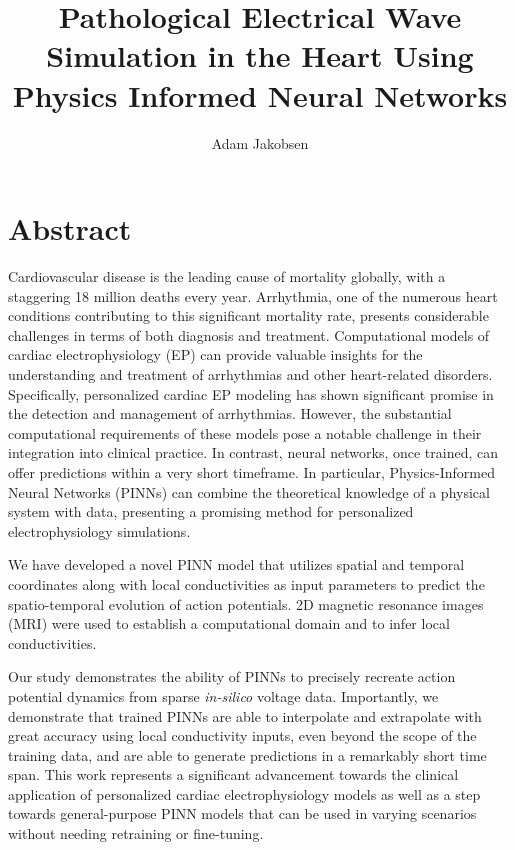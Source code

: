 \documentclass[USenglish]{uiomasterthesis}  %
\begin{document}
\title{Pathological Electrical Wave Simulation in the Heart Using Physics Informed Neural Networks}

\author{Adam Jakobsen }

\uiomasterfp[dept={Department of Physics},  %
  program={Computational Science: Physics},                        %
  supervisors={Gabriel Balaban, Molly Maleckar, Vajira Tambawita, Thus Nguyen and Morten Hjorth-Jensen},                    %
  long]  

\newpage

\section*{Abstract}
Cardiovascular disease is the leading cause of mortality globally, with a staggering 18 million deaths every year.
Arrhythmia, one of the numerous heart conditions contributing to this significant mortality rate, presents considerable challenges in terms of both diagnosis and treatment. 
Computational models of cardiac electrophysiology (EP) can provide valuable insights for the understanding and treatment of arrhythmias and other heart-related disorders. Specifically, personalized cardiac EP modeling has shown significant promise in the detection and management of arrhythmias. However, the substantial computational requirements of these models pose a notable challenge in their integration into clinical practice. In contrast, neural networks, once trained, can offer predictions within a very short timeframe.  In particular, Physics-Informed Neural Networks (PINNs) can combine the theoretical knowledge of a physical system with data, presenting a promising method for personalized electrophysiology simulations.


We have developed a novel PINN model that utilizes spatial and temporal coordinates along with local conductivities as input parameters to predict the spatio-temporal evolution of action potentials. 2D magnetic resonance images (MRI) were used to establish a computational domain and to infer local conductivities.


Our study demonstrates the ability of PINNs to precisely recreate action potential dynamics from sparse \textit{in-silico} voltage data.
Importantly, we demonstrate that trained PINNs are able to interpolate and extrapolate with great accuracy using local conductivity inputs, even beyond the scope of the training data, and are able to generate predictions in a remarkably short time span.
This work represents a significant advancement towards the clinical application of personalized cardiac electrophysiology models as well as a step towards general-purpose PINN models that can be used in varying scenarios
without needing retraining or fine-tuning.
\end{document}
